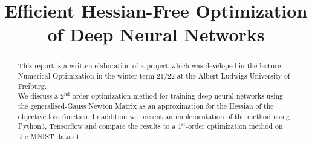 \documentclass[conference]{IEEEtran}
\begin{document}
\title{Efficient Hessian-Free Optimization of Deep Neural Networks
}

\author{
\and
{}
\and
{}
}

\maketitle
\thispagestyle{plain}
\pagestyle{plain}

\begin{abstract}
\noindent
This report is a written elaboration of a project which was developed in the lecture Numerical Optimization in the winter term 21/22 at the Albert Ludwigs University of Freiburg.\\
We discuss a $2^{\text{nd}}$-order optimization method for training deep neural networks using the generalised-Gauss Newton Matrix as an approximation for the Hessian of the objective loss function. In addition we present an implementation of the method using Python3, Tensorflow and compare the results to a $1^{\text{st}}$-order optimization method on the MNIST dataset.
\end{abstract}
\end{document}
